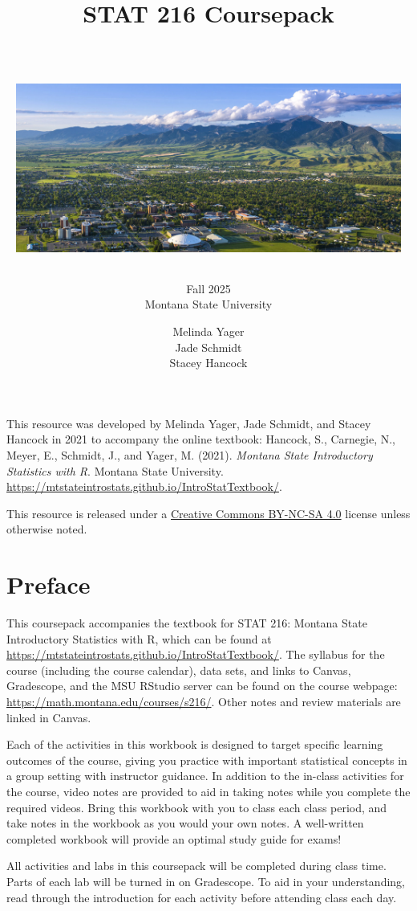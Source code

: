 \documentclass[
]{report}
\title{\textbf{STAT 216 Coursepack}\\
\strut \\
\includegraphics[width=5in,height=\textheight,keepaspectratio]{images/msu-campus.jpg}}
\subtitle{Fall 2025\\
Montana State University}
\author{Melinda Yager\\
Jade Schmidt\\
Stacey Hancock}
\date{}
\begin{document}
\maketitle

\newpage
\thispagestyle{empty}

This resource was developed by Melinda Yager, Jade Schmidt, and Stacey Hancock in 2021 to accompany the online textbook: Hancock, S., Carnegie, N., Meyer, E., Schmidt, J., and Yager, M. (2021). \emph{Montana State Introductory Statistics with R}. Montana State University. \url{https://mtstateintrostats.github.io/IntroStatTextbook/}.

This resource is released under a \href{https://creativecommons.org/licenses/by-nc-sa/4.0/}{Creative Commons BY-NC-SA 4.0} license unless otherwise noted.

\setcounter{tocdepth}{1}
\tableofcontents
\thispagestyle{empty}

\newpage
\setcounter{page}{1}

\chapter*{Preface}\label{preface}

This coursepack accompanies the textbook for STAT 216: Montana State Introductory Statistics with R, which can be found at \url{https://mtstateintrostats.github.io/IntroStatTextbook/}. The syllabus for the course (including the course calendar), data sets, and links to Canvas, Gradescope, and the MSU RStudio server can be found on the course webpage: \url{https://math.montana.edu/courses/s216/}.
Other notes and review materials are linked in Canvas.

Each of the activities in this workbook is designed to target specific learning outcomes of the course, giving you practice with important statistical concepts in a group setting with instructor guidance. In addition to the in-class activities for the course, video notes are provided to aid in taking notes while you complete the required videos. Bring this workbook with you to class each class period, and take notes in the workbook as you would your own notes. A well-written completed workbook will provide an optimal study guide for exams!

All activities and labs in this coursepack will be completed during class time. Parts of each lab will be turned in on Gradescope. To aid in your understanding, read through the introduction for each activity before attending class each day.
\end{document}
